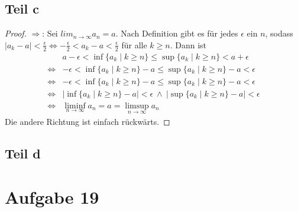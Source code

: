\documentclass[10pt,a4paper]{article}
\begin{document}
\subsection{Teil c}
\begin{proof}
  $\Rightarrow$: Sei $lim_{n \rightarrow \infty} a_{n} = a$.
  Nach Definition gibt es für jedes $\epsilon$ ein $n$, sodass $|a_{k} - a| < \frac{\epsilon}{2} \Leftrightarrow -\frac{\epsilon}{2} < a_{k} - a < \frac{\epsilon}{2}$ für alle $k \ge n$.
  Dann ist
  \begin{align*}
    & a - \epsilon < \inf \{ a_{k} \mid k \ge n \} \le \sup \{ a_{k} \mid k \ge n \} < a + \epsilon\\
    \Leftrightarrow & -\epsilon < \inf \{ a_{k} \mid k \ge n \} - a \le \sup \{ a_{k} \mid k \ge n \} - a < \epsilon\\
    \Leftrightarrow & -\epsilon < \inf \{ a_{k} \mid k \ge n \} - a \le \sup \{ a_{k} \mid k \ge n \} - a < \epsilon\\
    \Leftrightarrow & |\inf \{ a_{k} \mid k \ge n \} - a| < \epsilon\ \land\ |\sup \{ a_{k} \mid k \ge n \} - a| < \epsilon\\
    \Leftrightarrow & \liminf_{n \rightarrow \infty} a_{n} = a = \limsup_{n \rightarrow \infty} a_{n}
  \end{align*}
  Die andere Richtung ist einfach rückwärts.
\end{proof}

\subsection{Teil d}

\section{Aufgabe 19}
\end{document}
